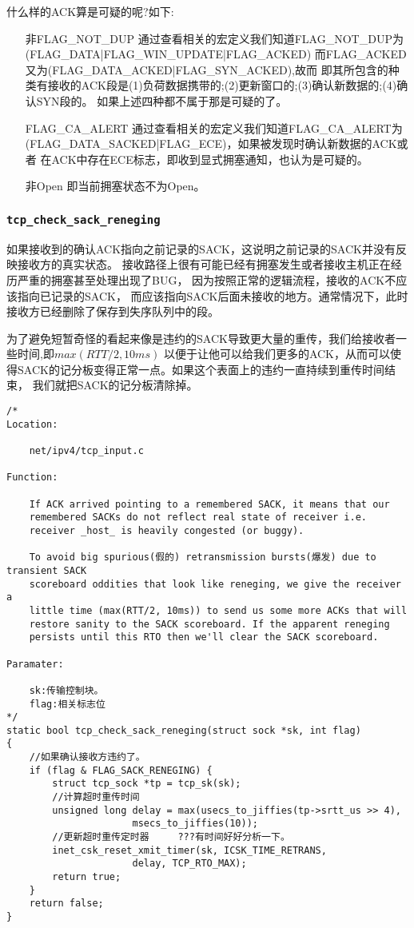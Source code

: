 	什么样的ACK算是可疑的呢?如下:
\begin{enumerate}
\item[非FLAG\_NOT\_DUP]	通过查看相关的宏定义我们知道FLAG\_NOT\_DUP为(FLAG\_DATA|FLAG\_WIN\_UPDATE|FLAG\_ACKED)
						而FLAG\_ACKED又为(FLAG\_DATA\_ACKED|FLAG\_SYN\_ACKED),故而
						即其所包含的种类有接收的ACK段是(1)负荷数据携带的;(2)更新窗口的;(3)确认新数据的;(4)确认SYN段的。
						如果上述四种都不属于那是可疑的了。
			
\item[FLAG\_CA\_ALERT]	通过查看相关的宏定义我们知道FLAG\_CA\_ALERT为(FLAG\_DATA\_SACKED|FLAG\_ECE)，如果被发现时确认新数据的ACK或者
						在ACK中存在ECE标志，即收到显式拥塞通知，也认为是可疑的。\color{red}{似乎和上面的有矛盾，}
\item[非Open]			即当前拥塞状态不为Open。
\end{enumerate}
		\subsubsection{\texttt{tcp_check_sack_reneging}}
			如果接收到的确认ACK指向之前记录的SACK，这说明之前记录的SACK并没有反映接收方的真实状态。
			接收路径上很有可能已经有拥塞发生或者接收主机正在经历严重的拥塞甚至处理出现了BUG，
			因为按照正常的逻辑流程，接收的ACK不应该指向已记录的SACK，
			而应该指向SACK后面未接收的地方。通常情况下，此时接收方已经删除了保存到失序队列中的段。
			
			为了避免短暂奇怪的看起来像是违约的SACK导致更大量的重传，我们给接收者一些时间,即$max(RTT/2, 10ms)$
			以便于让他可以给我们更多的ACK，从而可以使得SACK的记分板变得正常一点。如果这个表面上的违约一直持续到重传时间结束，
			我们就把SACK的记分板清除掉。
\begin{verbatim}
/*
Location:

	net/ipv4/tcp_input.c

Function:

	If ACK arrived pointing to a remembered SACK, it means that our
	remembered SACKs do not reflect real state of receiver i.e.
	receiver _host_ is heavily congested (or buggy).

	To avoid big spurious(假的) retransmission bursts(爆发) due to transient SACK
	scoreboard oddities that look like reneging, we give the receiver a
	little time (max(RTT/2, 10ms)) to send us some more ACKs that will
	restore sanity to the SACK scoreboard. If the apparent reneging
	persists until this RTO then we'll clear the SACK scoreboard.

Paramater:

	sk:传输控制块。
	flag:相关标志位
*/
static bool tcp_check_sack_reneging(struct sock *sk, int flag)
{
	//如果确认接收方违约了。
	if (flag & FLAG_SACK_RENEGING) {
		struct tcp_sock *tp = tcp_sk(sk);
		//计算超时重传时间
		unsigned long delay = max(usecs_to_jiffies(tp->srtt_us >> 4),
					  msecs_to_jiffies(10));
		//更新超时重传定时器		???有时间好好分析一下。
		inet_csk_reset_xmit_timer(sk, ICSK_TIME_RETRANS,
					  delay, TCP_RTO_MAX);
		return true;
	}
	return false;
}
\end{verbatim}
